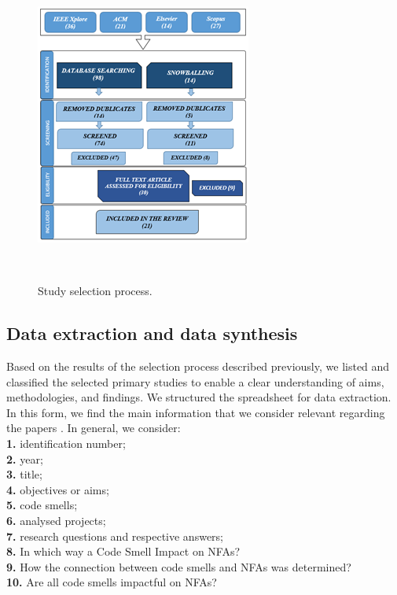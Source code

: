 \documentclass{sigchi}
\begin{document}
\begin{figure}[h]
	\centering
	\includegraphics[width=1\columnwidth]{Figures/2}
	\caption{Study selection process.}~\label{fig:figure1}
\end{figure}

\subsection{Data extraction and data synthesis}
Based on the results of the selection process described previously, we listed and classified the selected primary studies to enable a clear understanding of aims, methodologies, and findings. We structured the spreadsheet for data extraction. In this form, we find the main information that we consider relevant regarding the papers \cite{Munalbayeva}. In general, we consider:\\
\textbf{1.}	identification number; \\
\textbf{2.}	year; \\
\textbf{3.}	title; \\
\textbf{4.}	objectives or aims;\\ 
\textbf{5.}	code smells; \\
\textbf{6.}	analysed projects;\\
\textbf{7.}	research questions and respective answers;\\
\textbf{8.}	In which way a Code Smell Impact on NFAs? \\
\textbf{9.}	How the connection between code smells and NFAs was determined? \\
\textbf{10.} Are all code smells impactful on NFAs? \\
\end{document}
